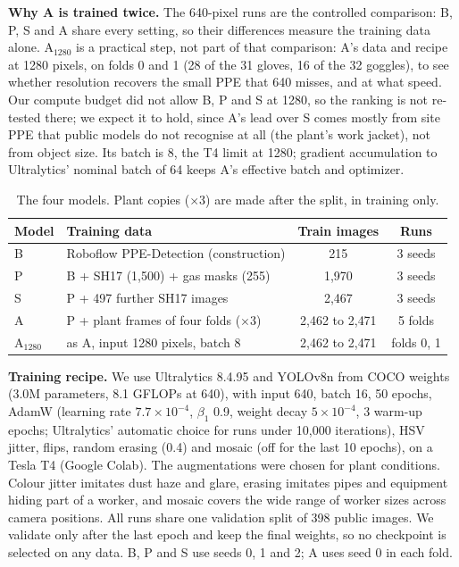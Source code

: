\textbf{Why A is trained twice.} The 640-pixel runs are the controlled comparison: B, P, S and A share every setting, so their differences measure the training data alone. A$_{1280}$ is a practical step, not part of that comparison: A's data and recipe at 1280 pixels, on folds 0 and 1 (28 of the 31 gloves, 16 of the 32 goggles), to see whether resolution recovers the small PPE that 640 misses, and at what speed. Our compute budget did not allow B, P and S at 1280, so the ranking is not re-tested there; we expect it to hold, since A's lead over S comes mostly from site PPE that public models do not recognise at all (the plant's work jacket), not from object size. Its batch is 8, the T4 limit at 1280; gradient accumulation to Ultralytics' nominal batch of 64 keeps A's effective batch and optimizer.

\begin{table}[H]
\caption{The four models. Plant copies ($\times$3) are made after the split, in training only.}
\label{tab:models}
\centering
\scriptsize
\setlength{\tabcolsep}{4pt}
\begin{tabular}{llcc}
\toprule
Model & Training data & Train images & Runs \\
\midrule
B & Roboflow PPE-Detection (construction) & 215 & 3 seeds \\
P & B + SH17 (1{,}500) + gas masks (255) & 1{,}970 & 3 seeds \\
S & P + 497 further SH17 images & 2{,}467 & 3 seeds \\
A & P + plant frames of four folds ($\times$3) & 2{,}462 to 2{,}471 & 5 folds \\
A$_{1280}$ & as A, input 1280 pixels, batch 8 & 2{,}462 to 2{,}471 & folds 0, 1 \\
\bottomrule
\end{tabular}
\end{table}

\textbf{Training recipe.} We use Ultralytics 8.4.95 \cite{ultralytics2023} and YOLOv8n from COCO weights (3.0M parameters, 8.1 GFLOPs at 640), with input 640, batch 16, 50 epochs, AdamW (learning rate $7.7\times10^{-4}$, $\beta_1$ 0.9, weight decay $5\times10^{-4}$, 3 warm-up epochs; Ultralytics' automatic choice for runs under 10{,}000 iterations), HSV jitter, flips, random erasing (0.4) and mosaic (off for the last 10 epochs), on a Tesla T4 (Google Colab). The augmentations were chosen for plant conditions. Colour jitter imitates dust haze and glare, erasing imitates pipes and equipment hiding part of a worker, and mosaic covers the wide range of worker sizes across camera positions. All runs share one validation split of 398 public images. We validate only after the last epoch and keep the final weights, so no checkpoint is selected on any data. B, P and S use seeds 0, 1 and 2; A uses seed 0 in each fold.

